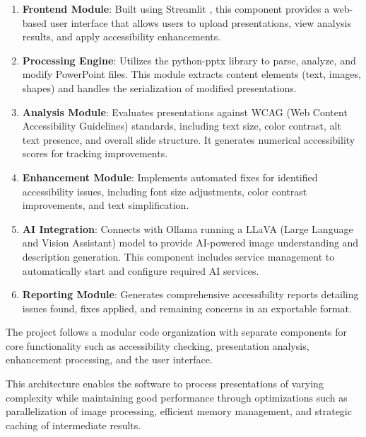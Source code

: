 \documentclass[preprint,review,12pt]{elsarticle} %
\begin{document}
\begin{enumerate}
    \item \textbf{Frontend Module}: Built using Streamlit \cite{streamlit}, this component provides a web-based user interface that allows users to upload presentations, view analysis results, and apply accessibility enhancements.
    
    \item \textbf{Processing Engine}: Utilizes the python-pptx library \cite{python-pptx} to parse, analyze, and modify PowerPoint files. This module extracts content elements (text, images, shapes) and handles the serialization of modified presentations.
    
    \item \textbf{Analysis Module}: Evaluates presentations against WCAG (Web Content Accessibility Guidelines) \cite{wcag} standards, including text size, color contrast, alt text presence, and overall slide structure. It generates numerical accessibility scores for tracking improvements.
    
    \item \textbf{Enhancement Module}: Implements automated fixes for identified accessibility issues, including font size adjustments, color contrast improvements, and text simplification.
    
    \item \textbf{AI Integration}: Connects with Ollama \cite{ollama} running a LLaVA (Large Language and Vision Assistant) \cite{llava} model to provide AI-powered image understanding and description generation. This component includes service management to automatically start and configure required AI services.
    
    \item \textbf{Reporting Module}: Generates comprehensive accessibility reports detailing issues found, fixes applied, and remaining concerns in an exportable format.
\end{enumerate}

The project follows a modular code organization with separate components for core functionality such as accessibility checking, presentation analysis, enhancement processing, and the user interface.

This architecture enables the software to process presentations of varying complexity while maintaining good performance through optimizations such as parallelization of image processing, efficient memory management, and strategic caching of intermediate results.
\end{document}
